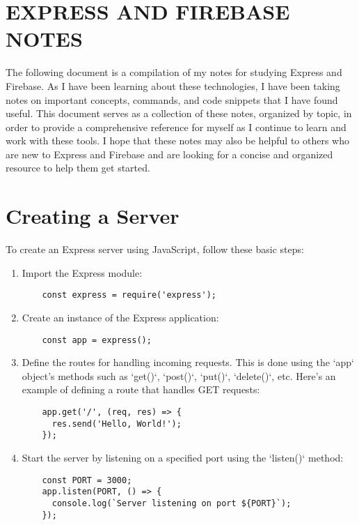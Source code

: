 \documentclass{article}
\begin{document}
\section*{EXPRESS AND FIREBASE NOTES}

The following document is a compilation of my notes for studying Express and Firebase. As I have been learning about these technologies, I have been taking notes on important concepts, commands, and code snippets that I have found useful. This document serves as a collection of these notes, organized by topic, in order to provide a comprehensive reference for myself as I continue to learn and work with these tools. I hope that these notes may also be helpful to others who are new to Express and Firebase and are looking for a concise and organized resource to help them get started.

\section{Creating a Server}

To create an Express server using JavaScript, follow these basic steps:

\begin{enumerate}
  \item Import the Express module:
  \begin{verbatim}
    const express = require('express');
  \end{verbatim}
  \item Create an instance of the Express application:
  \begin{verbatim}
    const app = express();
  \end{verbatim}
  \item Define the routes for handling incoming requests. This is done using the `app` object's methods such as `get()`, `post()`, `put()`, `delete()`, etc. Here's an example of defining a route that handles GET requests:
  \begin{verbatim}
    app.get('/', (req, res) => {
      res.send('Hello, World!');
    });
  \end{verbatim}
  \item Start the server by listening on a specified port using the `listen()` method:
  \begin{verbatim}
    const PORT = 3000;
    app.listen(PORT, () => {
      console.log(`Server listening on port ${PORT}`);
    });
  \end{verbatim}
\end{enumerate}
\end{document}
